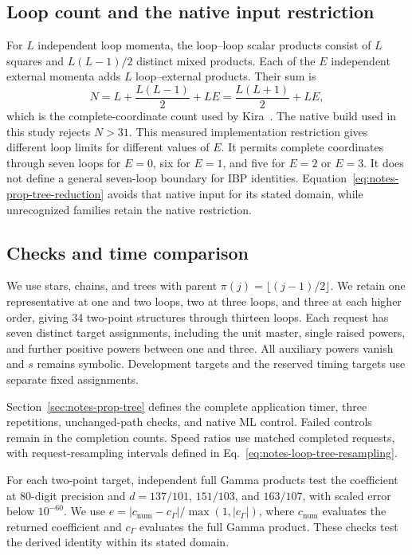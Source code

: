 \subsection{Loop count and the native input restriction}
For $L$ independent loop momenta, the loop--loop scalar products consist of $L$ squares and $L(L-1)/2$ distinct mixed products. Each of the $E$ independent external momenta adds $L$ loop--external products. Their sum is
\begin{equation}
 N=L+\frac{L(L-1)}2+LE=\frac{L(L+1)}2+LE,
 \label{eq:notes-prop-tree-index-count}
\end{equation}
which is the complete-coordinate count used by Kira~\cite{Kira3}. The native build used in this study rejects $N>31$. This measured implementation restriction gives different loop limits for different values of $E$. It permits complete coordinates through seven loops for $E=0$, six for $E=1$, and five for $E=2$ or $E=3$. It does not define a general seven-loop boundary for IBP identities. Equation~\eqref{eq:notes-prop-tree-reduction} avoids that native input for its stated domain, while unrecognized families retain the native restriction.

\subsection{Checks and time comparison}
We use stars, chains, and trees with parent $\pi(j)=\lfloor(j-1)/2\rfloor$. We retain one representative at one and two loops, two at three loops, and three at each higher order, giving 34 two-point structures through thirteen loops. Each request has seven distinct target assignments, including the unit master, single raised powers, and further positive powers between one and three. All auxiliary powers vanish and $s$ remains symbolic. Development targets and the reserved timing targets use separate fixed assignments.

Section~\ref{sec:notes-prop-tree} defines the complete application timer, three repetitions, unchanged-path checks, and native ML control. Failed controls remain in the completion counts. Speed ratios use matched completed requests, with request-resampling intervals defined in Eq.~\eqref{eq:notes-loop-tree-resampling}.

For each two-point target, independent full Gamma products test the coefficient at 80-digit precision and $d=137/101$, $151/103$, and $163/107$, with scaled error below $10^{-60}$. We use $e=|c_{\mathrm{num}}-c_\Gamma|/\max(1,|c_\Gamma|)$, where $c_{\mathrm{num}}$ evaluates the returned coefficient and $c_\Gamma$ evaluates the full Gamma product. These checks test the derived identity within its stated domain.
